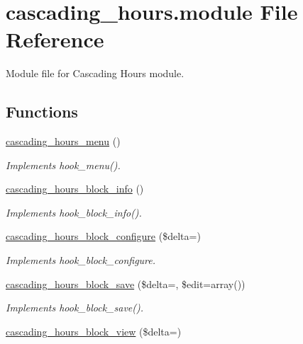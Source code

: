 \hypertarget{cascading__hours_8module}{}\section{cascading\+\_\+hours.\+module File Reference}
\label{cascading__hours_8module}


Module file for Cascading Hours module.  


\subsection*{Functions}
\begin{DoxyCompactItemize}
\item 
\hyperlink{cascading__hours_8module_a0f1734cd7045d15d485821e708af1c15_a0f1734cd7045d15d485821e708af1c15}{cascading\+\_\+hours\+\_\+menu} ()
\begin{DoxyCompactList}\small\item\em Implements hook\+\_\+menu(). \end{DoxyCompactList}\item 
\hyperlink{cascading__hours_8module_a1132e952a3f3b1f728714f948f2f7e08_a1132e952a3f3b1f728714f948f2f7e08}{cascading\+\_\+hours\+\_\+block\+\_\+info} ()
\begin{DoxyCompactList}\small\item\em Implements hook\+\_\+block\+\_\+info(). \end{DoxyCompactList}\item 
\hyperlink{cascading__hours_8module_ac63fffa82bb1bb003baf3c448d17fc70_ac63fffa82bb1bb003baf3c448d17fc70}{cascading\+\_\+hours\+\_\+block\+\_\+configure} (\$delta=\textquotesingle{}\textquotesingle{})
\begin{DoxyCompactList}\small\item\em Implements hook\+\_\+block\+\_\+configure. \end{DoxyCompactList}\item 
\hyperlink{cascading__hours_8module_a142e02e075672ace77c9d5d703f37124_a142e02e075672ace77c9d5d703f37124}{cascading\+\_\+hours\+\_\+block\+\_\+save} (\$delta=\textquotesingle{}\textquotesingle{}, \$edit=array())
\begin{DoxyCompactList}\small\item\em Implements hook\+\_\+block\+\_\+save(). \end{DoxyCompactList}\item 
\hyperlink{cascading__hours_8module_a51124e0951939ed33419c36bb1be9fa3_a51124e0951939ed33419c36bb1be9fa3}{cascading\+\_\+hours\+\_\+block\+\_\+view} (\$delta=\textquotesingle{}\textquotesingle{})

\end{DoxyCompactItemize}
